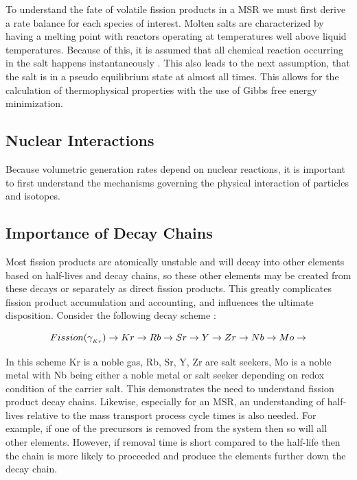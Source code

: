 To understand the fate of volatile fission products in a MSR we must first derive a rate balance for each species of interest. Molten salts are characterized by having a melting point with reactors operating at temperatures well above liquid temperatures. Because of this, it is assumed that all chemical reaction occurring in the salt happens instantaneously \cite{baes1974}\cite{kedl1972}. This also leads to the next assumption, that the salt is in a pseudo equilibrium state at almost all times. This allows for the calculation of thermophysical properties with the use of Gibbs free energy minimization. 

\subsection{Nuclear Interactions}
Because volumetric generation rates depend on nuclear reactions, it is important to first understand the mechanisms governing the physical interaction of particles and isotopes. 

\subsection{Importance of Decay Chains}
Most fission products are atomically unstable and will decay into other elements based on half-lives and decay chains, so these other elements may be created from these decays or separately as direct fission products. This greatly complicates fission product accumulation and accounting, and influences the ultimate disposition. Consider the following decay scheme \cite{kedl1972}:

\begin{equation}
	Fission \space (\gamma_{_{Kr}})\rightarrow Kr \rightarrow Rb \rightarrow Sr \rightarrow Y \rightarrow Zr \rightarrow Nb \rightarrow Mo \rightarrow
\end{equation}

In this scheme Kr is a noble gas, Rb, Sr, Y, Zr are salt seekers, Mo is a noble metal with Nb being either a noble metal or salt seeker depending on redox condition of the carrier salt.  This demonstrates the need to understand fission product decay chains. Likewise, especially for an MSR, an understanding of half-lives relative to the mass transport process cycle times is also needed. For example, if one of the precursors is removed from the system then so will all other elements. However, if removal time is short compared to the half-life then the chain is more likely to proceeded and produce the elements further down the decay chain. 

